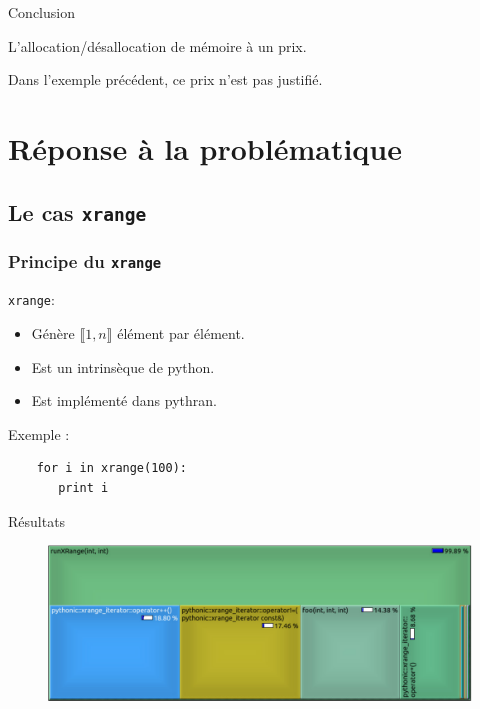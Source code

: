 \documentclass{beamer}
\begin{document}
\begin{frame}{Conclusion}

  L'allocation/désallocation de mémoire à un prix.

  \pause Dans l'exemple précédent, ce prix n'est pas justifié.

\end{frame}

\section{Réponse à la problématique}

\subsection{Le cas \texttt{xrange}}

\begin{frame}[fragile]
  \frametitle{Principe du \texttt{xrange}}

  \texttt{xrange}:
  \begin{itemize}
    \item Génère $\llbracket 1, n\rrbracket$ élément par élément.  
    \item Est un intrinsèque de python.  
    \item Est implémenté dans pythran.
  
  \end{itemize}

  \pause Exemple :

  \begin{lstlisting}
    for i in xrange(100): 
       print i
  \end{lstlisting}

\end{frame}

\begin{frame}{Résultats}

  \begin{figure}[h]
    \includegraphics[width=\textwidth]{./Pictures/xrange}
  \end{figure}

\end{frame}
\end{document}
